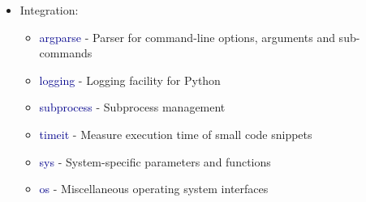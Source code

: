 \begin{frame}[allowframebreaks]
\begin{itemize}
      \item Integration:
      \begin{itemize}
         \item \textcolor{DarkBlue}{argparse} - Parser for command-line options, arguments and sub-commands
         \item \textcolor{DarkBlue}{logging} - Logging facility for Python
         \item \textcolor{DarkBlue}{subprocess} - Subprocess management
         \item \textcolor{DarkBlue}{timeit} - Measure execution time of small code snippets
         \item \textcolor{DarkBlue}{sys} - System-specific parameters and functions
         \item \textcolor{DarkBlue}{os} - Miscellaneous operating system interfaces
      \end{itemize}
   \end{itemize}
\end{frame}

